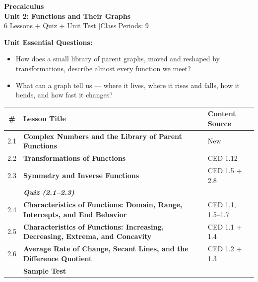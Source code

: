 \documentclass[10pt]{article}
\begin{document}
\thispagestyle{empty}

\vspace{-1.05in}

\begin{center}
  {\color{white}\textbf{\LARGE Precalculus}}\\[6pt]
  {\color{lilacmid}\Large\textbf{Unit 2: Functions and Their Graphs}}\\[4pt]
  {\color{white}\small 6 Lessons + Quiz + Unit Test \quad|\quad Class Periods: 9}
\end{center}

\vspace{0.26in}

\begin{tcolorbox}[colback=goldbg, colframe=goldacc, boxrule=0.8pt, arc=2mm,
    left=3mm, right=3mm, top=2mm, bottom=2mm]
\small\textbf{Unit Essential Questions:}
\begin{itemize}[leftmargin=1.4em, itemsep=2pt, topsep=2pt]
  \item How does a small library of parent graphs, moved and reshaped by transformations, describe almost every function we meet?
  \item What can a graph tell us --- where it lives, where it rises and falls, how it bends, and how fast it changes?
\end{itemize}
\end{tcolorbox}

\vspace{0.14in}

\begin{tocbox}
\small
\renewcommand{\arraystretch}{1.45}
\begin{tabularx}{\linewidth}{@{} c >{\bfseries}X l @{}}
\rowcolor{lilac}
\textbf{\#} & \textbf{Lesson Title} & \textbf{Content Source} \\
\midrule
2.1 & Complex Numbers and the Library of Parent Functions & New \\
2.2 & Transformations of Functions & CED 1.12 \\
2.3 & Symmetry and Inverse Functions & CED 1.5 + 2.8 \\
    & \textit{Quiz (2.1--2.3)} & \\
2.4 & Characteristics of Functions: Domain, Range, Intercepts, and End Behavior & CED 1.1, 1.5--1.7 \\
2.5 & Characteristics of Functions: Increasing, Decreasing, Extrema, and Concavity & CED 1.1 + 1.4 \\
2.6 & Average Rate of Change, Secant Lines, and the Difference Quotient & CED 1.2 + 1.3 \\
\midrule
\rowcolor{lilac}
     & \textbf{Sample Test} &      \\
\end{tabularx}
\end{tocbox}
\end{document}
